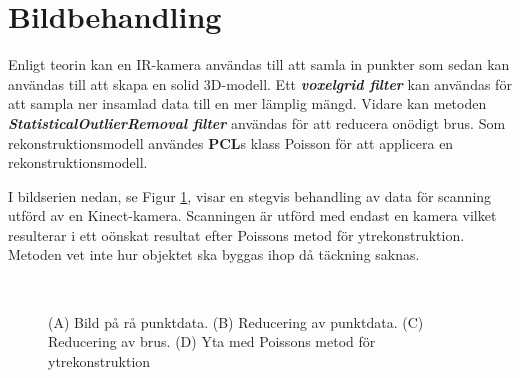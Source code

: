 \documentclass[a4paper,12pt,oneside,final]{extbook}
\begin{document}
\newpage
\section{Bildbehandling}
Enligt teorin kan en IR-kamera användas till att samla in punkter som sedan kan användas till att skapa en solid 3D-modell. Ett \emph\textbf{{voxelgrid filter}} kan användas för att sampla ner insamlad data till en mer lämplig mängd. Vidare kan metoden \emph\textbf{{StatisticalOutlierRemoval filter}} användas för att reducera onödigt brus. Som rekonstruktionsmodell användes \textbf{PCL}s klass Poisson för att applicera en rekonstruktionsmodell.

I bildserien nedan, se Figur \ref{fig:scans}, visar en stegvis behandling av data för scanning utförd av en Kinect-kamera. Scanningen är utförd med endast en kamera vilket resulterar i ett oönskat resultat efter Poissons metod för ytrekonstruktion. Metoden vet inte hur objektet ska byggas ihop då täckning saknas.


\begin{figure}[H]
\centering
\mbox{\quad
{}}
\mbox{\quad
{}}
\caption[Bilder från ytrekonstruktion]{(A) Bild på rå punktdata. (B) Reducering av punktdata. (C) Reducering av brus. (D) Yta med Poissons metod för ytrekonstruktion} \label{fig:scans}
\end{figure}
\end{document}
